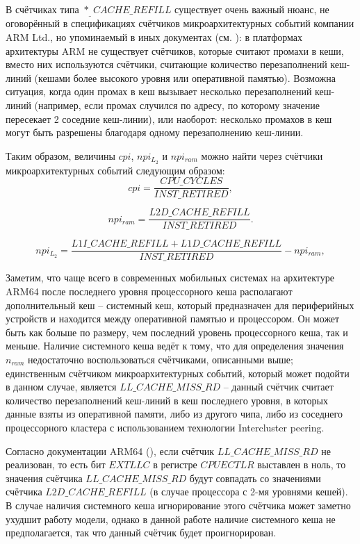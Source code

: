     В счётчиках типа $*_\_CACHE\_REFILL$ существует очень важный нюанс, не оговорённый
    в спецификациях счётчиков микроархитектурных событий компании ARM Ltd., но упоминаемый
    в иных документах (см. \cite{ArmPerfAnalyses}): в платформах архитектуры ARM не существует счётчиков,
    которые считают промахи в кеши, вместо них используются счётчики, считающие
    количество перезаполнений кеш-линий (кешами более высокого уровня или оперативной памятью).
    Возможна ситуация, когда один промах в кеш вызывает несколько перезаполнений кеш-линий
    (например, если промах случился по адресу, по которому значение пересекает 2 соседние кеш-линии),
    или наоборот: несколько промахов в кеш могут быть разрешены благодаря одному перезаполнению кеш-линии.

    Таким образом, величины $cpi$, $npi_{L_2}$ и $npi_{ram}$ можно найти через счётчики микроархитектурных
    событий следующим образом:
    \begin{equation}
        cpi = \frac{CPU\_CYCLES}{INST\_RETIRED},
    \end{equation}

    \begin{equation}
        npi_{ram} = \frac{L2D\_CACHE\_REFILL}{INST\_RETIRED}.
    \end{equation}

    \begin{equation}
        npi_{L_2} = \frac{L1I\_CACHE\_REFILL + L1D\_CACHE\_REFILL}{INST\_RETIRED} - npi_{ram},
    \end{equation}

    Заметим, что чаще всего в современных мобильных системах на архитектуре ARM64 после последнего
    уровня процессорного кеша располагают дополнительный кеш -- системный кеш,
    который предназначен для периферийных устройств и находится между оперативной памятью и процессором.
    Он может быть как больше по размеру, чем последний уровень процессорного кеша, так и меньше.
    Наличие системного кеша ведёт к тому, что для определения значения $n_{ram}$ недостаточно
    воспользоваться счётчиками, описанными выше; единственным счётчиком микроархитектурных событий,
    который может подойти в данном случае, является $LL\_CACHE\_MISS\_RD$ -- данный счётчик считает
    количество перезаполнений кеш-линий в кеш последнего уровня, в которых данные взяты из оперативной памяти,
    либо из другого чипа, либо из соседнего процессорного кластера с использованием технологии Intercluster peering.

    Согласно документации ARM64 (\cite{ArmPerfAnalyses}), если счётчик $LL\_CACHE\_MISS\_RD$ не реализован,
    то есть бит $EXTLLC$ в регистре $CPUECTLR$ выставлен в ноль, то значения счётчика $LL\_CACHE\_MISS\_RD$
    будут совпадать со значениями счётчика $L2D\_CACHE\_REFILL$ (в случае процессора с 2-мя уровнями кешей).
    В случае наличия системного кеша игнорирование этого счётчика может заметно ухудшит
    работу модели, однако в данной работе наличие системного кеша не предполагается, так что данный
    счётчик будет проигнорирован.

